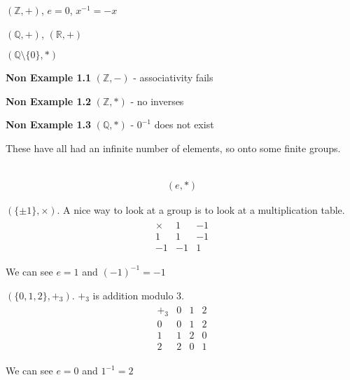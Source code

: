 \begin{example}
$(\mathbb{Z}, +)$, $e = 0$, $x^{-1} = -x$
\end{example}

\begin{example}
$(\mathbb{Q}, +)$, $(\mathbb{R}, +)$
\end{example}

\begin{example}
$(\mathbb{Q} \setminus \{ 0 \}, *)$
\end{example}

\textbf{Non Example 1.1} $(\mathbb{Z}, -)$ - associativity fails

\textbf{Non Example 1.2} $(\mathbb{Z}, *)$ - no inverses

\textbf{Non Example 1.3} $(\mathbb{Q}, *)$ - $0^{-1}$ does not exist

These have all had an infinite number of elements, so onto some finite groups.

\begin{example} ~\vspace*{-1.5\baselineskip}
  \begin{align*}
    (e, *)
  \end{align*} 
\end{example}

\begin{example}
$(\{\pm 1\}, \times)$. A nice way to look at a group is to look at a multiplication table.
\begin{align*}
    \begin{array}{c|cc}
        \times & 1 & -1 \\
        \hline
        1 & 1 & -1 \\
        -1 & -1 & 1 
    \end{array} 
\end{align*}

We can see $e = 1$ and $(-1)^{-1} = -1$
\end{example}

\begin{example}
$(\{0, 1, 2\}, +_3)$. $+_3$ is addition modulo 3.
\begin{align*}
    \begin{array}{c|ccc}
        +_3 & 0 & 1 & 2 \\
        \hline
        0 & 0 & 1 & 2\\
        1 & 1 & 2 & 0 \\
        2 & 2 & 0 & 1
    \end{array} 
\end{align*}

We can see $e = 0$ and $1^{-1} = 2$
\end{example}

